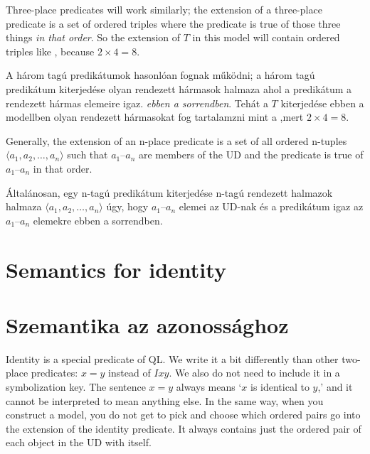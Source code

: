 Three-place predicates will work similarly; the extension of a three-place predicate is a set of ordered triples where the predicate is true of those three things \emph{in that order}. So the extension of $T$ in this model will contain ordered triples like , because $2\times 4 = 8$.

A három tagú predikátumok hasonlóan fognak működni; a három tagú predikátum kiterjedése olyan rendezett hármasok halmaza ahol a predikátum a rendezett hármas elemeire igaz. \emph{ebben a sorrendben}. Tehát a $T$ kiterjedése ebben a modellben olyan rendezett hármasokat fog tartalamzni mint a ,mert $2\times 4 = 8$.

Generally, the extension of an n-place predicate is a set of all ordered n-tuples ${\langle}a_1, a_2,\ldots, a_n{\rangle}$ such that $a_1$--$a_n$ are members of the UD and the predicate is true of $a_1$--$a_n$ in that order.

Általánosan, egy n-tagú predikátum kiterjedése  n-tagú rendezett halmazok halmaza ${\langle}a_1, a_2,\ldots, a_n{\rangle}$ úgy, hogy $a_1$--$a_n$ elemei az UD-nak és a predikátum igaz az  $a_1$--$a_n$ elemekre ebben a sorrendben.





\section*{Semantics for identity}
\section{Szemantika az azonossághoz}
Identity is a special predicate of QL. We write it a bit differently than other two-place predicates: $x=y$ instead of $Ixy$. We also do not need to include it in a symbolization key. The sentence $x=y$ always means `$x$ is identical to $y$,'  and it cannot be interpreted to mean anything else. In the same way, when you construct a model, you do not get to pick and choose which ordered pairs go into the extension of the identity predicate. It always contains just the ordered pair of each object in the UD with itself.

